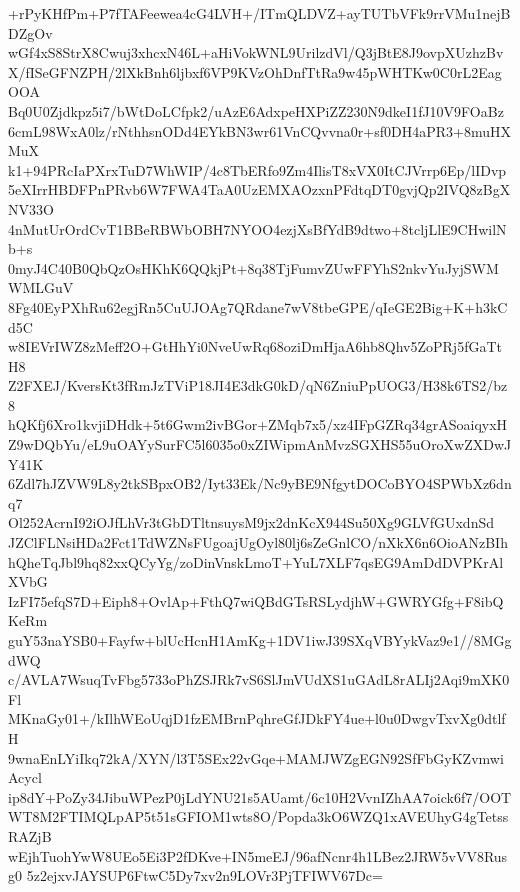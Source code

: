 +rPyKHfPm+P7fTAFeewea4cG4LVH+/ITmQLDVZ+ayTUTbVFk9rrVMu1nejBDZgOv
wGf4xS8StrX8Cwuj3xhcxN46L+aHiVokWNL9UrilzdVl/Q3jBtE8J9ovpXUzhzBv
X/fISeGFNZPH/2lXkBnh6ljbxf6VP9KVzOhDnfTtRa9w45pWHTKw0C0rL2EagOOA
Bq0U0Zjdkpz5i7/bWtDoLCfpk2/uAzE6AdxpeHXPiZZ230N9dkeI1fJ10V9FOaBz
6cmL98WxA0lz/rNthhsnODd4EYkBN3wr61VnCQvvna0r+sf0DH4aPR3+8muHXMuX
k1+94PRcIaPXrxTuD7WhWIP/4c8TbERfo9Zm4IlisT8xVX0ItCJVrrp6Ep/lIDvp
5eXIrrHBDFPnPRvb6W7FWA4TaA0UzEMXAOzxnPFdtqDT0gvjQp2IVQ8zBgXNV33O
4nMutUrOrdCvT1BBeRBWbOBH7NYOO4ezjXsBfYdB9dtwo+8tcljLlE9CHwilNb+s
0myJ4C40B0QbQzOsHKhK6QQkjPt+8q38TjFumvZUwFFYhS2nkvYuJyjSWMWMLGuV
8Fg40EyPXhRu62egjRn5CuUJOAg7QRdane7wV8tbeGPE/qIeGE2Big+K+h3kCd5C
w8IEVrIWZ8zMeff2O+GtHhYi0NveUwRq68oziDmHjaA6hb8Qhv5ZoPRj5fGaTtH8
Z2FXEJ/KversKt3fRmJzTViP18JI4E3dkG0kD/qN6ZniuPpUOG3/H38k6TS2/bz8
hQKfj6Xro1kvjiDHdk+5t6Gwm2ivBGor+ZMqb7x5/xz4IFpGZRq34grASoaiqyxH
Z9wDQbYu/eL9uOAYySurFC5l6035o0xZIWipmAnMvzSGXHS55uOroXwZXDwJY41K
6Zdl7hJZVW9L8y2tkSBpxOB2/Iyt33Ek/Nc9yBE9NfgytDOCoBYO4SPWbXz6dnq7
Ol252AcrnI92iOJfLhVr3tGbDTltnsuysM9jx2dnKcX944Su50Xg9GLVfGUxdnSd
JZClFLNsiHDa2Fct1TdWZNsFUgoajUgOyl80lj6sZeGnlCO/nXkX6n6OioANzBIh
hQheTqJbl9hq82xxQCyYg/zoDinVnskLmoT+YuL7XLF7qsEG9AmDdDVPKrAlXVbG
IzFI75efqS7D+Eiph8+OvlAp+FthQ7wiQBdGTsRSLydjhW+GWRYGfg+F8ibQKeRm
guY53naYSB0+Fayfw+blUcHcnH1AmKg+1DV1iwJ39SXqVBYykVaz9e1//8MGgdWQ
c/AVLA7WsuqTvFbg5733oPhZSJRk7vS6SlJmVUdXS1uGAdL8rALIj2Aqi9mXK0Fl
MKnaGy01+/kIlhWEoUqjD1fzEMBrnPqhreGfJDkFY4ue+l0u0DwgvTxvXg0dtlfH
9wnaEnLYiIkq72kA/XYN/l3T5SEx22vGqe+MAMJWZgEGN92SfFbGyKZvmwiAcycl
ip8dY+PoZy34JibuWPezP0jLdYNU21s5AUamt/6c10H2VvnIZhAA7oick6f7/OOT
WT8M2FTIMQLpAP5t51sGFIOM1wts8O/Popda3kO6WZQ1xAVEUhyG4gTetssRAZjB
wEjhTuohYwW8UEo5Ei3P2fDKve+IN5meEJ/96afNcnr4h1LBez2JRW5vVV8Rusg0
5z2ejxvJAYSUP6FtwC5Dy7xv2n9LOVr3PjTFIWV67Dc=
